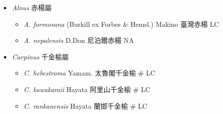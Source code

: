 
  \begin{itemize}
 \item[] \textit{Alnus} 赤楊屬
                                
  \begin{itemize}
        \item[] \textit{A. formosana} (Burkill ex Forbes \& Hemsl.) Makino  臺灣赤楊   LC
        \item[] \textit{A. nepalensis} D.Don  尼泊爾赤楊   NA
  \end{itemize}
 \item[] \textit{Carpinus} 千金榆屬
                                
  \begin{itemize}
        \item[] \textit{C. hebestroma} Yamam.  太魯閣千金榆  \# LC
        \item[] \textit{C. kawakamii} Hayata  阿里山千金榆  \# LC
        \item[] \textit{C. rankanensis} Hayata  蘭邯千金榆  \# LC
  \end{itemize}
  \end{itemize}
